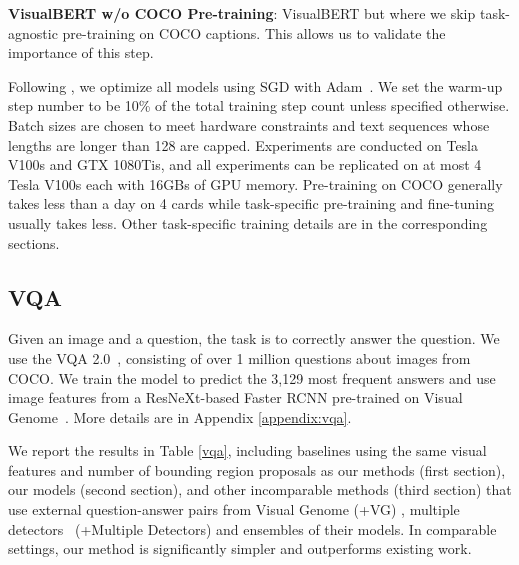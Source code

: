 \documentclass{article} \usepackage{iclr2019_conference,times}
\newcommand{\model}{VisualBERT\xspace}
\newcommand{\modelnp}{VisualBERT w/o COCO Pre-training\xspace}
\begin{document}
\textbf{\modelnp}: \model but where we skip task-agnostic pre-training on COCO captions. This allows us to validate the importance of this step.

Following \citet{devlin2018bert}, we optimize all models using SGD with Adam~\citep{kingma2014adam}. We set the warm-up step number to be 10\% of the total training step count unless specified otherwise. Batch sizes are chosen to meet hardware constraints and text sequences whose lengths are longer than 128 are capped. Experiments are conducted on Tesla V100s and GTX 1080Tis, and all experiments can be replicated on at most 4 Tesla V100s each with 16GBs of GPU memory. Pre-training on COCO generally takes less than a day on 4 cards while task-specific pre-training and fine-tuning usually takes less. 
Other task-specific training details are in the corresponding sections.

\subsection{VQA}
Given an image and a question, the task is to correctly answer the question. 
We use the VQA 2.0~\citep{balanced_vqa_v2}, consisting of over 1 million questions about images from COCO.
We train the model to predict the 3,129 most frequent answers and use image features from a ResNeXt-based Faster RCNN pre-trained on Visual Genome~\citep{jiang2018pythia}.
More details are in Appendix \ref{appendix:vqa}.

We report the results in Table \ref{vqa}, including baselines using the same visual features and number of bounding region proposals as our methods (first section), our models (second section), and other incomparable methods (third section) that use external question-answer pairs from Visual Genome (+VG) , multiple detectors~\citep{yu2019multimodal} (+Multiple Detectors) and ensembles of their models.
In comparable settings, our method is significantly simpler and outperforms existing work.
\end{document}
